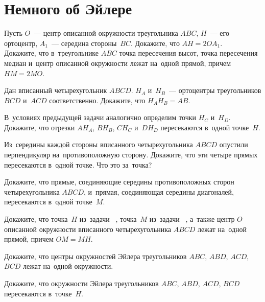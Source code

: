 
\section*{Немного об Эйлере}


\begin{problems}

\item
\sp
Пусть $O$~--- центр описанной окружности треугольника $ABC$,
$H$~--- его ортоцентр,
$A_1$~--- середина стороны~$BC$.
Докажите, что $AH = 2 O A_1$.
\\
\sp
Докажите, что в~треугольнике $ABC$ точка пересечения высот, точка пересечения
медиан и~центр описанной окружности лежат на~одной прямой, причем $HM = 2 MO$.

\item
Дан вписанный четырехугольник $ABCD$.
$H_A$ и~$H_B$~--- ортоцентры треугольников $BCD$ и~$ACD$ соответственно.
Докажите, что $H_A H_B = AB$.

\item
{}%
В~условиях предыдущей задачи аналогично определим точки $H_C$ и~$H_D$.
Докажите, что отрезки $A H_A$, $B H_B$, $C H_C$ и~$D H_D$ пересекаются
в~одной точке~$H$.

\item
Из~середины каждой стороны вписанного четырехугольника $ABCD$ опустили
перпендикуляр на~противоположную сторону.
Докажите, что эти четыре прямых пересекаются в~одной точке.
Что это за~точка?

\item
{}%
Докажите, что прямые, соединяющие середины противоположных сторон
четырехугольника $ABCD$, и~прямая, соединяющая середины диагоналей,
пересекаются в~одной точке~$M$.

\item
Докажите, что точка~$H$ из~задачи~%
,
точка~$M$ из~задачи~%
,
а~также центр $O$ описанной окружности вписанного четырехугольника $ABCD$
лежат на~одной прямой, причем $OM = MH$.

\item
Докажите, что центры окружностей Эйлера треугольников
$ABC$, $ABD$, $ACD$, $BCD$ лежат на~одной окружности.

\item
Докажите, что окружности Эйлера треугольников $ABC$, $ABD$, $ACD$, $BCD$
пересекаются в~точке~$H$.

\end{problems}

